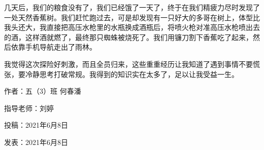 几天后，我们的粮食没有了，我们已经饿了一天了，终于在我们精疲力尽时发现了一处天然香蕉树。我们赶忙跑过去，可是却发现有一只好大的多哥在树上，体型比我头还大，我直接把高压水枪里的水瓶换成酒瓶后，将喷火枪对准高压水枪喷出去的酒，这样酒就燃了，最终那只蜘蛛被烧死了。我们用镰刀割下香蕉吃了起来，然后依靠手机导航走出了雨林。

我觉得这次探险好刺激，而且全员归来，这些重重经历让我知道了遇到事情不要慌张，要冷静思考打破常规。我得到的知识实在太多了，足以让我受益一生。





\vspace{10pt}



作者：五（3）班 何春潘



指导老师：刘婷



投稿：2021年6月8日



发表：2021年6月8日










                



\vspace{10pt}

\hline



